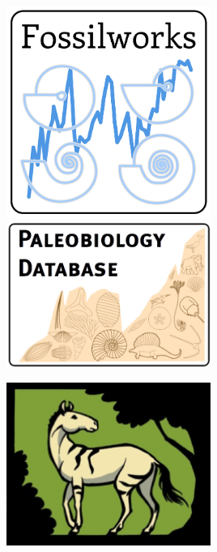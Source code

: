 \documentclass{beamer}
\begin{document}
\begin{frame}
\begin{columns}
\begin{column}{0.5\textwidth}
      \includegraphics[height = 0.3\textheight, width = 0.5\textwidth, keepaspectratio = true]{figure/fossilworks}
      \includegraphics[width = 0.5\textwidth, keepaspectratio = true]{figure/paleodb}

      \includegraphics[height = 0.3\textheight, width = 0.5\textwidth, keepaspectratio = true]{figure/now}
    \end{column}
  \end{columns}
\end{frame}
\end{document}
